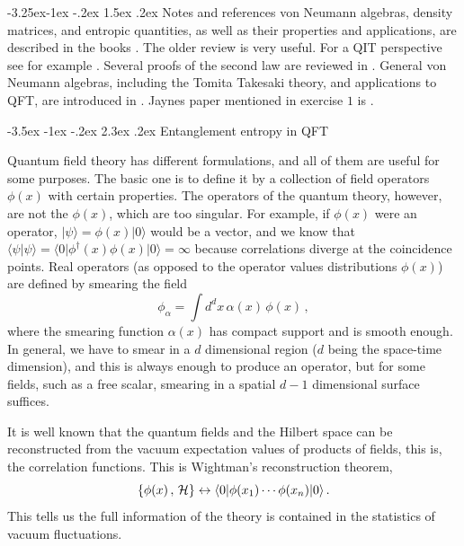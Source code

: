 \documentclass[11pt,a4paper]{article}
\makeatletter
\renewcommand\section{\@startsection {section}{1}{\z@}%
                                 {-3.5ex \@plus -1ex \@minus -.2ex}%
                                   {2.3ex \@plus.2ex}%
                                   {\normalfont\large\bfseries}}
\renewcommand\subsection{\@startsection{subsection}{2}{\z@}%
                                   {-3.25ex\@plus -1ex \@minus -.2ex}%
                                     {1.5ex \@plus .2ex}%
                                     {\normalfont\bfseries}}
\numberwithin{equation}{section}
\newcommand{\be}{\begin{equation}}
\newcommand{\ee}{\end{equation}}
\makeatother
\begin{document}
\subsection{Notes and references}
 von Neumann algebras, density matrices, and entropic quantities, as well as their properties and applications, are described in the books \cite{ohya2004quantum,petz2007quantum}. The older review \cite{wehrl1978general} is very useful. For a QIT perspective see for example \cite{nielsen2002quantum,vedral}. Several proofs of the second law are reviewed in \cite{sagawa2013second}. General von Neumann algebras, including the Tomita Takesaki theory, and applications to QFT, are introduced in \cite{Haag:1992hx}. Jaynes paper mentioned in exercise $1$ is \cite{jaynes1957information}.

\newpage
 
\section{Entanglement entropy in QFT}
\label{EEQFT}

Quantum field theory has different formulations, and all of them are useful for some purposes. The basic one is to define it by a collection of field operators $\phi(x)$ with certain properties.  The operators of the quantum theory, however, are not the $\phi(x)$, which are too singular. For example, if $\phi(x)$ were an operator, $|\psi\rangle=\phi(x)|0\rangle$ would be a vector, and we know that $\langle \psi|\psi \rangle= \langle 0|\phi^\dagger(x)\phi(x)|0\rangle=\infty$ because correlations diverge at the coincidence points. Real operators (as opposed to the operator values distributions $\phi(x)$) are defined by smearing the field 
\be
\phi_\alpha=\int d^dx\, \alpha(x)\, \phi(x)\,,
\ee
where the smearing function $\alpha(x)$ has compact support and is smooth enough. In general, we have to smear in a $d$ dimensional region ($d$ being the space-time dimension), and this is always enough to produce an operator, but for some fields, such as a free scalar, smearing in a spatial $d-1$ dimensional surface suffices.

It is well known that the quantum fields and the Hilbert space can be reconstructed from the vacuum expectation values of products of fields, this is, the correlation functions. This is Wightman's reconstruction theorem,  
\be
\{\phi(x)\,, \, {\cal H}\} \leftrightarrow \langle 0| \phi(x_1)\cdots \phi(x_n)|0\rangle\,.  \label{recon}
\ee
This tells us the full information of the theory is contained in the statistics of vacuum fluctuations. 
\end{document}
